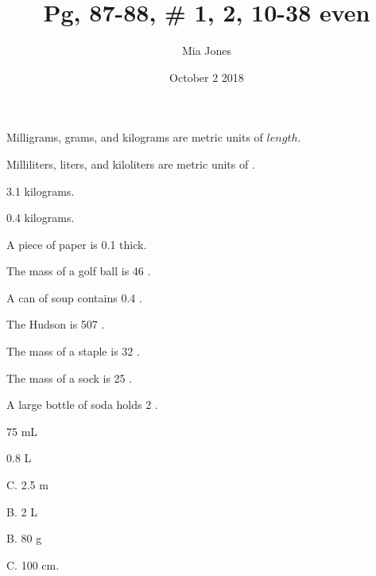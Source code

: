 \documentclass[12pt]{article}
\newenvironment{problem}[2][Problem]{\begin{trivlist}
\item[\hskip \labelsep {\bfseries #1}\hskip \labelsep {\bfseries #2.}]}{\end{trivlist}}
\begin{document}
 
\title{Pg, 87-88, # 1, 2, 10-38 even}
\author{Mia Jones}
\date{October 2 2018}
\maketitle

\begin{problem}{1}
Milligrams, grams, and kilograms are metric units of $\boxed{length}.$
\end{problem}

\begin{problem}{2}
Milliliters, liters, and kiloliters are metric units of .
\end{problem}

\begin{problem}{10}
3.1 kilograms.
\end{problem}


\begin{problem}{12}
0.4 kilograms.
\end{problem}

\begin{problem}{14}
A piece of paper is 0.1  thick.
\end{problem}

\begin{problem}{16}
The mass of a golf ball is 46 . 
\end{problem}

\begin{problem}{18}
A can of soup contains 0.4 .
\end{problem}

\begin{problem}{20}
The Hudson is 507 .
\end{problem}

\begin{problem}{22}
The mass of a staple is 32 .
\end{problem}

\begin{problem}{24}
The mass of a sock is 25 .
\end{problem}

\begin{problem}{26}
A large bottle of soda holds 2 .
\end{problem}

\begin{problem}{28}
75 mL
\end{problem}

\begin{problem}{30}
0.8 L
\end{problem}

\begin{problem}{32}
C. 2.5 m
\end{problem}

\begin{problem}{34}
B. 2 L
\end{problem}

\begin{problem}{36}
B. 80 g
\end{problem}

\begin{problem}{38}
C. 100 cm.
\end{problem}
\end{document}
